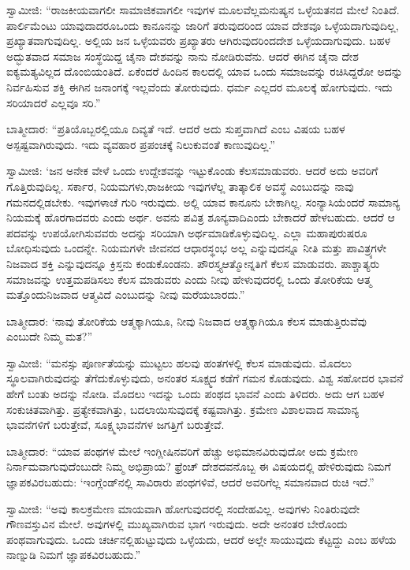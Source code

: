 ಸ್ವಾಮೀಜಿ: “ರಾಜಕೀಯವಾಗಲೀ ಸಾಮಾಜಿಕವಾಗಲೀ ಇವುಗಳ ಮೂಲವೆಲ್ಲ\break ಮನುಷ್ಯನ ಒಳ್ಳೆಯತನದ ಮೇಲೆ ನಿಂತಿದೆ. ಪಾರ್ಲಿಮೆಂಟು ಯಾವುದಾದರೂ\break ಒಂದು ಕಾನೂನನ್ನು ಜಾರಿಗೆ ತರುವುದರಿಂದ ಯಾವ ದೇಶವೂ ಒಳ್ಳೆಯದಾಗುವುದಿಲ್ಲ, ಪ್ರಖ್ಯಾತವಾಗುವುದಿಲ್ಲ. ಅಲ್ಲಿಯ ಜನ ಒಳ್ಳೆಯವರು ಪ್ರಖ್ಯಾತರು ಆಗಿರುವುದರಿಂದ\break ದೇಶ ಒಳ್ಳೆಯದಾಗುವುದು. ಬಹಳ ಅದ್ಭುತವಾದ ಸಮಾಜ ಸಂಸ್ಥೆಯಿದ್ದ ಚೈನಾ ದೇಶವನ್ನು ನಾನು ನೋಡಿರುವೆನು. ಆದರೆ ಈಗಿನ ಚೈನಾ ದೇಶ ಐಕ್ಯಮತ್ಯವಿಲ್ಲದ ದೊಂಬಿಯಂತಿದೆ. ಏಕೆಂದರೆ ಹಿಂದಿನ ಕಾಲದಲ್ಲಿ ಯಾವ ಒಂದು ಸಮಾಜವನ್ನು ರಚಿಸಿದ್ದರೋ ಅದನ್ನು ನಿರ್ವಹಿಸುವ ಶಕ್ತಿ ಈಗಿನ ಜನಾಂಗಕ್ಕೆ ಇಲ್ಲವೆಂದು ತೋರುವುದು. ಧರ್ಮ ಎಲ್ಲದರ ಮೂಲಕ್ಕೆ ಹೋಗುವುದು. ಇದು ಸರಿಯಾದರೆ ಎಲ್ಲವೂ ಸರಿ.”

ಬಾತ್ಮೀದಾರ: “ಪ್ರತಿಯೊಬ್ಬರಲ್ಲಿಯೂ ದಿವ್ಯತೆ ಇದೆ. ಆದರೆ ಅದು ಸುಪ್ತವಾಗಿದೆ ಎಂಬ ವಿಷಯ ಬಹಳ ಅಸ್ಪಷ್ಟವಾಗಿರುವುದು. ಇದು ವ್ಯವಹಾರ ಪ್ರಪಂಚಕ್ಕೆ ನಿಲುಕುವಂತೆ ಕಾಣುವುದಿಲ್ಲ.”

ಸ್ವಾಮೀಜಿ: ‘ಜನ ಅನೇಕ ವೇಳೆ ಒಂದು ಉದ್ದೇಶವನ್ನು ಇಟ್ಟುಕೊಂಡು ಕೆಲಸ\break ಮಾಡುವರು. ಆದರೆ ಅದು ಅವರಿಗೆ ಗೊತ್ತಿರುವುದಿಲ್ಲ. ಸರ್ಕಾರ, ನಿಯಮಗಳು,\break ರಾಜಕೀಯ ಇವುಗಳೆಲ್ಲ ತಾತ್ಕಾಲಿಕ ಅವಸ್ಥೆ ಎಂಬುದನ್ನು ನಾವು ಗಮನದಲ್ಲಿಡಬೇಕು. ಇವುಗಳಾಚೆ ಗುರಿ ಇರುವುದು. ಅಲ್ಲಿ ಯಾವ ಕಾನೂನು ಬೇಕಾಗಿಲ್ಲ. ಸಂನ್ಯಾಸಿಯೆಂದರೆ ಸಾಮಾನ್ಯ ನಿಯಮಕ್ಕೆ ಹೊರಗಾದವರು ಎಂದು ಅರ್ಥ. ಅವನು ಪವಿತ್ರ ಶೂನ್ಯವಾದಿ\break ಎಂದು ಬೇಕಾದರೆ ಹೇಳಬಹುದು. ಆದರೆ ಆ ಪದವನ್ನು ಉಪಯೋಗಿಸುವವರು ಅದನ್ನು ಸರಿಯಾಗಿ ಅರ್ಥಮಾಡಿಕೊಳ್ಳುವುದಿಲ್ಲ. ಎಲ್ಲಾ ಮಹಾಪುರುಷರೂ ಬೋಧಿಸುವುದು ಒಂದನ್ನೇ. ನಿಯಮಗಳೇ ಜೀವನದ ಆಧಾರಸ್ಥಂಭ ಅಲ್ಲ ಎನ್ನುವುದನ್ನೂ ನೀತಿ ಮತ್ತು ಪಾವಿತ್ರ್ಯಗಳೇ ನಿಜವಾದ ಶಕ್ತಿ ಎನ್ನುವುದನ್ನೂ ಕ್ರಿಸ್ತನು ಕಂಡುಕೊಂಡನು. ಪೌರಸ್ತ್ಯ\break ಆತ್ಮೋನ್ನತಿಗೆ ಕೆಲಸ ಮಾಡುವರು. ಪಾಶ್ಚಾತ್ಯರು ಸಮಾಜವನ್ನು ಉತ್ತಮಪಡಿಸಲು ಕೆಲಸ ಮಾಡುವರು ಎಂದು ನೀವು ಹೇಳುವುದರಲ್ಲಿ ಒಂದು ತೋರಿಕೆಯ ಆತ್ಮ ಮತ್ತೊಂದು\break ನಿಜವಾದ ಆತ್ಮವಿದೆ ಎಂಬುದನ್ನು ನೀವು ಮರೆಯಬಾರದು.”

ಬಾತ್ಮೀದಾರ: ‘ನಾವು ತೋರಿಕೆಯ ಆತ್ಮಕ್ಕಾಗಿಯೂ, ನೀವು ನಿಜವಾದ ಆತ್ಮಕ್ಕಾಗಿಯೂ ಕೆಲಸ ಮಾಡುತ್ತಿರುವೆವು ಎಂಬುದೇ ನಿಮ್ಮ ಮತ?”

\eject

ಸ್ವಾಮೀಜಿ: “ಮನಸ್ಸು ಪೂರ್ಣತೆಯನ್ನು ಮುಟ್ಟಲು ಹಲವು ಹಂತಗಳಲ್ಲಿ ಕೆಲಸ ಮಾಡುವುದು. ಮೊದಲು ಸ್ಥೂಲವಾಗಿರುವುದನ್ನು ತೆಗೆದುಕೊಳ್ಳುವುದು, ಅನಂತರ ಸೂಕ್ಷ್ಮದ ಕಡೆಗೆ ಗಮನ ಕೊಡುವುದು. ವಿಶ್ವ ಸಹೋದರ ಭಾವನೆ ಹೇಗೆ ಬಂತು ಅದನ್ನು ನೋಡಿ. ಮೊದಲು ಇದನ್ನು ಒಂದು ಪಂಥದ ಭಾವನೆ ಎಂದು ತಿಳಿದರು. ಅದು ಆಗ ಬಹಳ ಸಂಕುಚಿತವಾಗಿತ್ತು. ಪ್ರತ್ಯೇಕವಾಗಿತ್ತು, ಬದಲಾಯಿಸುವುದಕ್ಕೆ ಕಷ್ಟವಾಗಿತ್ತು. ಕ್ರಮೇಣ ವಿಶಾಲವಾದ ಸಾಮಾನ್ಯ ಭಾವನೆಗಳಿಗೆ ಬರುತ್ತೇವೆ, ಸೂಕ್ಷ್ಮಭಾವನೆಗಳ ಜಗತ್ತಿಗೆ ಬರುತ್ತೇವೆ.

\vskip 4pt

ಬಾತ್ಮೀದಾರ: “ಯಾವ ಪಂಥಗಳ ಮೇಲೆ ಇಂಗ್ಲೀಷಿನವರಿಗೆ ಹೆಚ್ಚು ಅಭಿಮಾನ\-ವಿರುವುದೋ ಅದು ಕ್ರಮೇಣ ನಿರ್ನಾಮವಾಗುವುದೆಂಬುದೇ ನಿಮ್ಮ ಅಭಿಪ್ರಾಯ? ಫ್ರೆಂಚ್​ ದೇಶದವನೊಬ್ಬ ಈ ವಿಷಯದಲ್ಲಿ ಹೇಳಿರುವುದು ನಿಮಗೆ ಜ್ಞಾಪಕವಿರ\break ಬಹುದು: ‘ಇಂಗ್ಲೆಂಡ್​ನಲ್ಲಿ ಸಾವಿರಾರು ಪಂಥಗಳಿವೆ, ಆದರೆ ಅವರಿಗೆಲ್ಲ ಸಮಾನವಾದ ರುಚಿ ಇದೆ.”

\vskip 4pt

ಸ್ವಾಮೀಜಿ: “ಅವು ಕಾಲಕ್ರಮೇಣ ಮಾಯವಾಗಿ ಹೋಗುವುದರಲ್ಲಿ ಸಂದೇಹವಿಲ್ಲ. ಅವುಗಳು ನಿಂತಿರುವುದೇ ಗೌಣವಸ್ತುವಿನ ಮೇಲೆ. ಅವುಗಳಲ್ಲಿ ಮುಖ್ಯವಾಗಿರುವ ಭಾಗ ಇರುವುದು. ಅದೇ ಅನಂತರ ಬೇರೊಂದು ಪಂಥವಾಗುವುದು. ಒಂದು ಚರ್ಚಿನಲ್ಲಿ\break ಹುಟ್ಟುವುದು ಒಳ್ಳೆಯದು, ಆದರೆ ಅಲ್ಲೇ ಸಾಯುವುದು ಕೆಟ್ಟದ್ದು ಎಂಬ ಹಳೆಯ ನಾಣ್ನುಡಿ ನಿಮಗೆ ಜ್ಞಾಪಕವಿರಬಹುದು.”

